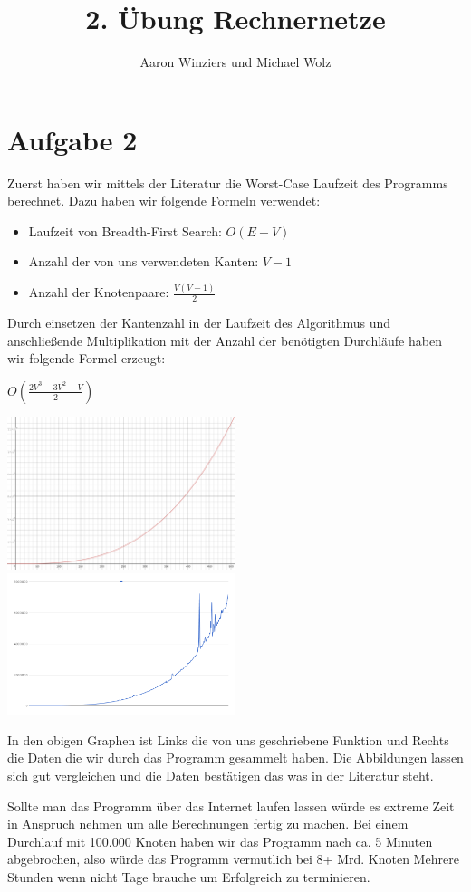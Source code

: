\documentclass[10pt,a4paper]{paper}
\author{Aaron Winziers und Michael Wolz}
\title{2. Übung Rechnernetze}
\begin{document}
	
	\maketitle
	
	\section*{Aufgabe 2}
	
	Zuerst haben wir mittels der Literatur die Worst-Case Laufzeit des Programms berechnet. Dazu haben wir folgende Formeln verwendet:
	\begin{itemize}
		\item Laufzeit von Breadth-First Search: $O(E+V)$
		\item Anzahl der von uns verwendeten Kanten: $V-1$
		\item Anzahl der Knotenpaare: $\frac{V(V-1)}{2}$
	\end{itemize}

	Durch einsetzen der Kantenzahl in der Laufzeit des Algorithmus und anschließende Multiplikation mit der Anzahl der benötigten Durchläufe haben wir folgende Formel erzeugt:
	\begin{center}
		$O(\frac{2V^{3}-3V^{2}+V}{2})$
	\end{center}
	
	\includegraphics[width=0.5\textwidth]{desmos-graph.png}
	\includegraphics[width=0.5\textwidth]{chart.png}
	
	In den obigen Graphen ist Links die von uns geschriebene Funktion und Rechts die Daten die wir durch das Programm gesammelt haben. Die Abbildungen lassen sich gut vergleichen und die Daten bestätigen das was in der Literatur steht.
	
	\par 
	
	Sollte man das Programm über das Internet laufen lassen würde es extreme Zeit in Anspruch nehmen um alle Berechnungen fertig zu machen. Bei einem Durchlauf mit 100.000 Knoten haben wir das Programm nach ca. 5 Minuten abgebrochen, also würde das Programm vermutlich bei 8+ Mrd. Knoten Mehrere Stunden wenn nicht Tage brauche um Erfolgreich zu terminieren.
	
\end{document}
